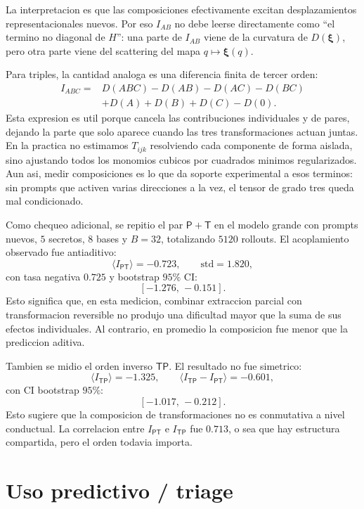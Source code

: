 ﻿\documentclass[10pt,twocolumn]{article}
\newcommand{\Ptrans}{\mathsf{P}}
\newcommand{\Ttrans}{\mathsf{T}}
\newcommand{\xrep}{\bm{\xi}}
\begin{document}
La interpretacion es que las composiciones efectivamente excitan desplazamientos representacionales nuevos. Por eso \(I_{AB}\) no debe leerse directamente como ``el termino no diagonal de \(H\)'': una parte de \(I_{AB}\) viene de la curvatura de \(D(\xrep)\), pero otra parte viene del scattering del mapa \(q\mapsto\xrep(q)\).

Para triples, la cantidad analoga es una diferencia finita de tercer orden:
\[
\begin{aligned}
I_{ABC}
={}&D(ABC)-D(AB)-D(AC)-D(BC)\\
&+D(A)+D(B)+D(C)-D(0).
\end{aligned}
\]
Esta expresion es util porque cancela las contribuciones individuales y de pares, dejando la parte que solo aparece cuando las tres transformaciones actuan juntas. En la practica no estimamos \(T_{ijk}\) resolviendo cada componente de forma aislada, sino ajustando todos los monomios cubicos por cuadrados minimos regularizados. Aun asi, medir composiciones es lo que da soporte experimental a esos terminos: sin prompts que activen varias direcciones a la vez, el tensor de grado tres queda mal condicionado.

Como chequeo adicional, se repitio el par \(\Ptrans+\Ttrans\) en el modelo grande con prompts nuevos, \(5\) secretos, \(8\) bases y \(B=32\), totalizando \(5120\) rollouts. El acoplamiento observado fue antiaditivo:
\[
\langle I_{\Ptrans\Ttrans}\rangle=-0.723,
\qquad
\mathrm{std}=1.820,
\]
con tasa negativa \(0.725\) y bootstrap \(95\%\) CI:
\[
[-1.276,\,-0.151].
\]
Esto significa que, en esta medicion, combinar extraccion parcial con transformacion reversible no produjo una dificultad mayor que la suma de sus efectos individuales. Al contrario, en promedio la composicion fue menor que la prediccion aditiva.

Tambien se midio el orden inverso \(\Ttrans\Ptrans\). El resultado no fue simetrico:
\[
\langle I_{\Ttrans\Ptrans}\rangle=-1.325,
\qquad
\langle I_{\Ttrans\Ptrans}-I_{\Ptrans\Ttrans}\rangle=-0.601,
\]
con CI bootstrap \(95\%\):
\[
[-1.017,\,-0.212].
\]
Esto sugiere que la composicion de transformaciones no es conmutativa a nivel conductual. La correlacion entre \(I_{\Ptrans\Ttrans}\) e \(I_{\Ttrans\Ptrans}\) fue \(0.713\), o sea que hay estructura compartida, pero el orden todavia importa.

\section{Uso predictivo / triage}
\end{document}
